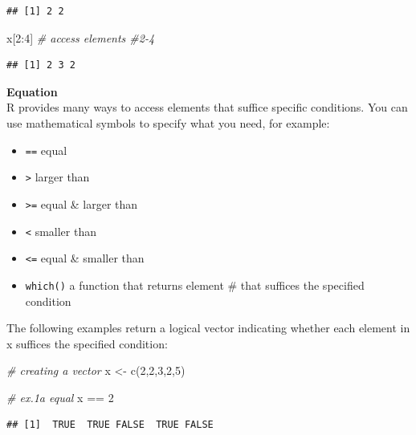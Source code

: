 \documentclass[
]{article}
\newenvironment{Shaded}{\begin{snugshade}}{\end{snugshade}}
\newcommand{\CommentTok}[1]{\textcolor[rgb]{0.56,0.35,0.01}{\textit{#1}}}
\newcommand{\DecValTok}[1]{\textcolor[rgb]{0.00,0.00,0.81}{#1}}
\newcommand{\FunctionTok}[1]{\textcolor[rgb]{0.00,0.00,0.00}{#1}}
\newcommand{\NormalTok}[1]{#1}
\newcommand{\OtherTok}[1]{\textcolor[rgb]{0.56,0.35,0.01}{#1}}
\newcommand{\SpecialCharTok}[1]{\textcolor[rgb]{0.00,0.00,0.00}{#1}}
\providecommand{\tightlist}{%
  \setlength{\itemsep}{0pt}\setlength{\parskip}{0pt}}
\begin{document}
\begin{verbatim}
## [1] 2 2
\end{verbatim}

\begin{Shaded}
\begin{Highlighting}[]
\NormalTok{x[}\DecValTok{2}\SpecialCharTok{:}\DecValTok{4}\NormalTok{] }\CommentTok{\# access elements \#2{-}4}
\end{Highlighting}
\end{Shaded}

\begin{verbatim}
## [1] 2 3 2
\end{verbatim}

\textbf{Equation}\\
R provides many ways to access elements that suffice specific conditions. You can use mathematical symbols to specify what you need, for example:

\begin{itemize}
\tightlist
\item
  \texttt{==} equal
\item
  \texttt{\textgreater{}} larger than
\item
  \texttt{\textgreater{}=} equal \& larger than
\item
  \texttt{\textless{}} smaller than
\item
  \texttt{\textless{}=} equal \& smaller than
\item
  \texttt{which()} a function that returns element \# that suffices the specified condition
\end{itemize}

The following examples return a logical vector indicating whether each element in x suffices the specified condition:

\begin{Shaded}
\begin{Highlighting}[]
\CommentTok{\# creating a vector}
\NormalTok{x }\OtherTok{\textless{}{-}} \FunctionTok{c}\NormalTok{(}\DecValTok{2}\NormalTok{,}\DecValTok{2}\NormalTok{,}\DecValTok{3}\NormalTok{,}\DecValTok{2}\NormalTok{,}\DecValTok{5}\NormalTok{)}

\CommentTok{\# ex.1a equal}
\NormalTok{x }\SpecialCharTok{==} \DecValTok{2}
\end{Highlighting}
\end{Shaded}

\begin{verbatim}
## [1]  TRUE  TRUE FALSE  TRUE FALSE
\end{verbatim}
\end{document}
